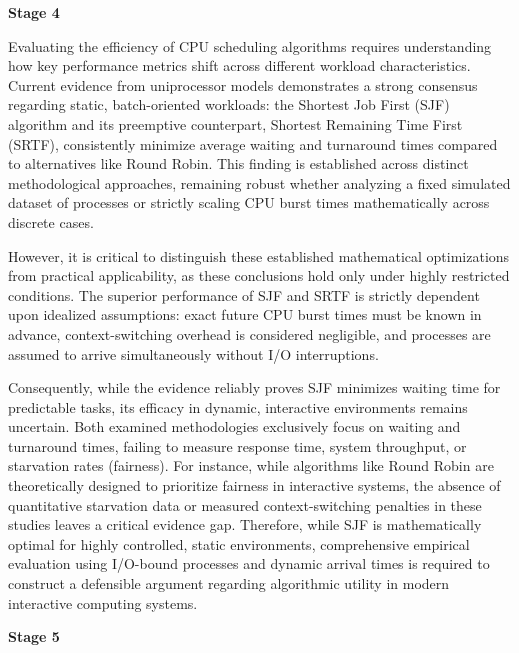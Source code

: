 \documentclass[11pt]{article}
\newcommand{\topicTitle}[1]{
    \vspace{1.5em}\noindent{\fontsize{14}{16.8}\selectfont \textbf{#1}}\par\vspace{0.5em}
}
\begin{document}
\newpage
{\centering\fontsize{16}{20}\selectfont\textbf{Stage 4}\par}
\vspace{1em}

\topicTitle{Technical Synthesis}

Evaluating the efficiency of CPU scheduling algorithms requires understanding how key performance metrics shift across different workload characteristics. Current evidence from uniprocessor models demonstrates a strong consensus regarding static, batch-oriented workloads: the Shortest Job First (SJF) algorithm and its preemptive counterpart, Shortest Remaining Time First (SRTF), consistently minimize average waiting and turnaround times compared to alternatives like Round Robin. This finding is established across distinct methodological approaches, remaining robust whether analyzing a fixed simulated dataset of processes or strictly scaling CPU burst times mathematically across discrete cases.

However, it is critical to distinguish these established mathematical optimizations from practical applicability, as these conclusions hold only under highly restricted conditions. The superior performance of SJF and SRTF is strictly dependent upon idealized assumptions: exact future CPU burst times must be known in advance, context-switching overhead is considered negligible, and processes are assumed to arrive simultaneously without I/O interruptions. 

Consequently, while the evidence reliably proves SJF minimizes waiting time for predictable tasks, its efficacy in dynamic, interactive environments remains uncertain. Both examined methodologies exclusively focus on waiting and turnaround times, failing to measure response time, system throughput, or starvation rates (fairness). For instance, while algorithms like Round Robin are theoretically designed to prioritize fairness in interactive systems, the absence of quantitative starvation data or measured context-switching penalties in these studies leaves a critical evidence gap. Therefore, while SJF is mathematically optimal for highly controlled, static environments, comprehensive empirical evaluation using I/O-bound processes and dynamic arrival times is required to construct a defensible argument regarding algorithmic utility in modern interactive computing systems.


\newpage
{\centering\fontsize{16}{20}\selectfont\textbf{Stage 5}\par}
\vspace{1em}
\end{document}
